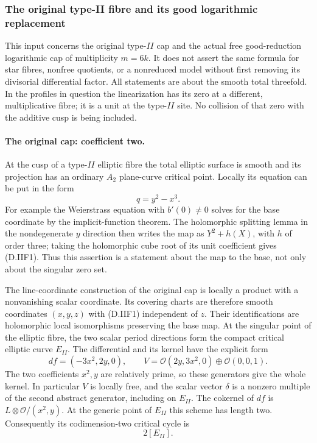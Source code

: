 \subsubsection*{The original type-II fibre and its good logarithmic replacement}

This input concerns the original type-$II$ cap and the actual free
good-reduction logarithmic cap of multiplicity $m=6k$.  It does not
assert the same formula for star fibres, nonfree quotients, or a
nonreduced model without first removing its divisorial differential
factor.  All statements are about the smooth total threefold.
In the profiles in question the linearization has its zero at
a different, multiplicative fibre; it is a unit at the type-$II$
site.  No collision of that zero with the additive cusp is
being included.

\paragraph{The original cap: coefficient two.}
At the cusp of a type-$II$ elliptic fibre the total elliptic surface
is smooth and its projection has an ordinary $A_2$ plane-curve
critical point.  Locally its equation can be put in the form
\[
                         q=y^2-x^3.
 \tag{D.IIF1}
\]
For example the Weierstrass equation with $b'(0)\ne0$ solves for
the base coordinate by the implicit-function theorem.  The
holomorphic splitting lemma in the nondegenerate $y$ direction
then writes the map as $Y^2+h(X)$, with $h$ of order three;
taking the holomorphic cube root of its unit coefficient gives
(D.IIF1).  Thus this assertion is a statement about the map to
the base, not only about the singular zero set.

The line-coordinate construction of the original cap is locally
a product with a nonvanishing scalar coordinate.  Its covering
charts are therefore smooth coordinates $(x,y,z)$ with (D.IIF1)
independent of $z$.  Their identifications are holomorphic local
isomorphisms preserving the base map.  At the singular point of
the elliptic fibre, the two scalar period directions form the
compact critical elliptic curve $E_{II}$.
The differential and its kernel have the explicit form
\[
 df=(-3x^2,2y,0),\qquad
 V=\mathcal O(2y,3x^2,0)\oplus\mathcal O(0,0,1).
 \tag{D.IIF2}
\]
The two coefficients $x^2,y$ are relatively prime, so these
generators give the whole kernel.  In particular $V$ is locally
free, and the scalar vector $\delta$ is a nonzero multiple of
the second abstract generator, including on $E_{II}$.
The cokernel of $df$ is $L\otimes\mathcal O/(x^2,y)$.
At the generic point of $E_{II}$ this scheme has length two.
Consequently its codimension-two critical cycle is
\[
                              2[E_{II}].
 \tag{D.IIF3}
\]

